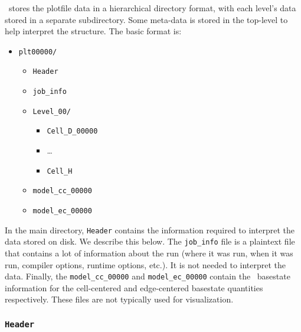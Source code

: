 \maestro\ stores the plotfile data in a hierarchical directory format,
with each level's data stored in a separate subdirectory.  Some meta-data
is stored in the top-level to help interpret the structure.  The basic format is:
\begin{itemize}
\item {\tt plt00000/}
  \begin{itemize}
    \item {\tt Header}
    \item {\tt job\_info}
    \item {\tt Level\_00/}
      \begin{itemize}
        \item {\tt Cell\_D\_00000}
        \item {\ldots}
        \item {\tt Cell\_H}
      \end{itemize}
    \item {\tt model\_cc\_00000}
    \item {\tt model\_ec\_00000}
  \end{itemize}
\end{itemize}
%
In the main directory, {\tt Header} contains the information required
to interpret the data stored on disk.  We describe this below.  The
{\tt job\_info} file is a plaintext file that contains a lot of
information about the run (where it was run, when it was run, compiler
options, runtime options, etc.).  It is not needed to interpret the
data.  Finally, the {\tt model\_cc\_00000} and {\tt model\_ec\_00000}
contain the \maestro\ basestate information for the cell-centered and
edge-centered basestate quantities respectively.  These files are not
typically used for visualization.

\subsubsection{\tt Header}

